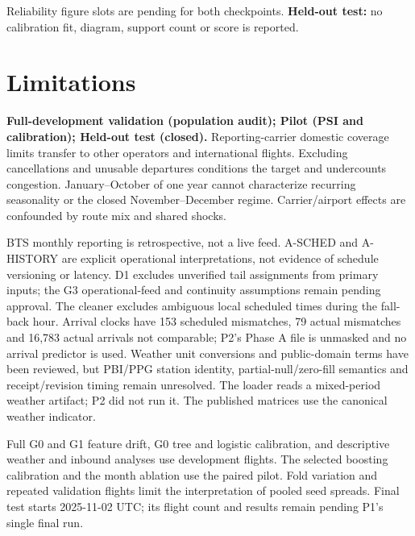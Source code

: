 \documentclass{article}
\begin{document}
\noindent Reliability figure slots are pending for both checkpoints.
\textbf{Held-out test:} no calibration fit, diagram, support count or score is reported.

\clearpage
\section{Limitations}
\textbf{Full-development validation (population audit); Pilot (PSI and calibration); Held-out test (closed).}
Reporting-carrier domestic coverage limits transfer to other operators and international flights. Excluding cancellations and unusable departures conditions the target and undercounts congestion. January--October of one year cannot characterize recurring seasonality or the closed November--December regime. Carrier/airport effects are confounded by route mix and shared shocks.

BTS monthly reporting is retrospective, not a live feed. A-SCHED and A-HISTORY are explicit operational interpretations, not evidence of schedule versioning or latency. D1 excludes unverified tail assignments from primary inputs; the G3 operational-feed and continuity assumptions remain pending approval. The cleaner excludes ambiguous local scheduled times during the fall-back hour. Arrival clocks have 153 scheduled mismatches, 79 actual mismatches and 16,783 actual arrivals not comparable; P2's Phase A file is unmasked and no arrival predictor is used. Weather unit conversions and public-domain terms have been reviewed, but PBI/PPG station identity, partial-null/zero-fill semantics and receipt/revision timing remain unresolved. The loader reads a mixed-period weather artifact; P2 did not run it. The published matrices use the canonical weather indicator.

Full G0 and G1 feature drift, G0 tree and logistic calibration, and descriptive weather and inbound analyses use development flights. The selected boosting calibration and the month ablation use the paired pilot. Fold variation and repeated validation flights limit the interpretation of pooled seed spreads. Final test starts 2025-11-02 UTC; its flight count and results remain pending P1's single final run.
\clearpage\appendix
\end{document}
